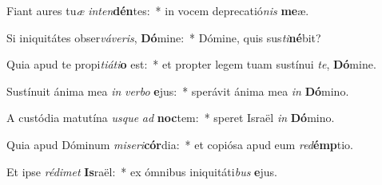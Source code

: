 \item Fiant aures tu\textit{æ} \textit{in}\textit{ten}\textbf{dén}tes:~* in vocem deprecatió\textit{nis} \textbf{me}æ.
\item Si iniquitátes obser\textit{vá}\textit{ve}\textit{ris}, \textbf{Dó}mine:~* Dómine, quis sus\textit{ti}\textbf{né}bit?
\item Quia apud te propi\textit{ti}\textit{á}\textit{ti}\textbf{o} est:~* et propter legem tuam sustínui \textit{te}, \textbf{Dó}mine.
\item Sustínuit ánima mea \textit{in} \textit{ver}\textit{bo} \textbf{e}jus:~* sperávit ánima mea \textit{in} \textbf{Dó}mino.
\item A custódia matutína \textit{us}\textit{que} \textit{ad} \textbf{noc}tem:~* speret Israël \textit{in} \textbf{Dó}mino.
\item Quia apud Dóminum \textit{mi}\textit{se}\textit{ri}\textbf{cór}dia:~* et copiósa apud eum \textit{red}\textbf{émp}tio.
\item Et ipse \textit{réd}\textit{i}\textit{met} \textbf{Is}raël:~* ex ómnibus iniquitáti\textit{bus} \textbf{e}jus.
